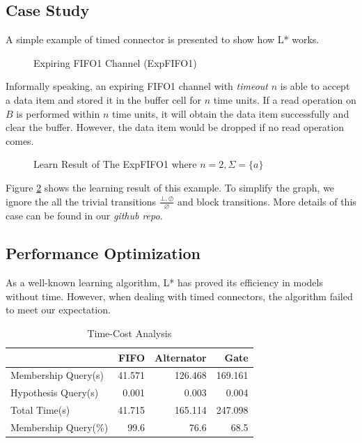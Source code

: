 \documentclass[conference, a4paper]{IEEEtran}
\newcommand{\rnoread}[0]{\oslash}
\newcommand{\rempty}[0]{\varnothing}
\begin{document}
\subsection{Case Study}
A simple example of timed connector is presented to show how L* works.
\begin{figure}[ht]
  \begin{center}
    
  \end{center}
  \caption{Expiring FIFO1 Channel (ExpFIFO1)}
  \label{fig:expfifo}
\end{figure}

Informally speaking, an expiring FIFO1 channel with \emph{timeout} $n$ is able to accept a data item
and stored it in the buffer cell for $n$ time units. If a read operation on $B$ is performed within
$n$ time units, it will obtain the data item successfully and clear the buffer. However, the data
item would be dropped if no read operation comes.

\begin{figure}[ht]
  \begin{center}
    
  \end{center}
  \caption{Learn Result of The ExpFIFO1 where $n=2,\Sigma=\{a\}$}
  \label{fig:expfifosemantics}
\end{figure}

Figure \ref{fig:expfifosemantics} shows the learning result of this example.
To simplify the graph, we ignore the all the trivial transitions $\frac{\bot,\rnoread}{\rempty}$
and block transitions. More details of this case can be found in our \emph{github repo}.

\subsection{Performance Optimization}
As a well-known learning algorithm, L* has proved its efficiency in models without time.
However, when dealing with timed connectors, the algorithm failed to meet our expectation.

\begin{table}[ht]
  \renewcommand{\arraystretch}{1.3}
  \caption{Time-Cost Analysis}
  \label{tabel:timecost}
  \centering
  \begin{tabular}{l||rrr}
    \hline
    & FIFO & Alternator & Gate \\
    \hline\hline
    Membership Query(s) & 41.571 & 126.468 & 169.161 \\
    Hypothesis Query(s) & 0.001 & 0.003 & 0.004 \\
    Total Time(s) & 41.715 & 165.114 & 247.098 \\
    Membership Query(\%) & 99.6 & 76.6 & 68.5 \\
    \hline
  \end{tabular}
\end{table}
\end{document}
